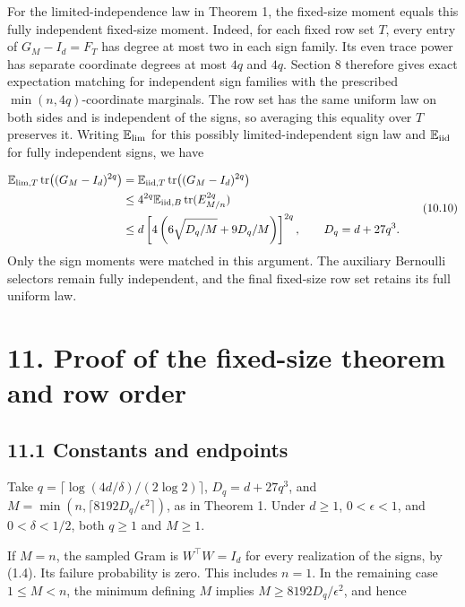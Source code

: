 \documentclass[11pt,a4paper]{article}
\begin{document}
For the limited-independence law in Theorem 1, the fixed-size moment equals this fully independent fixed-size moment. Indeed, for each fixed row set \(T\), every entry of \(G_M-I_d=F_T\) has degree at most two in each sign family. Its even trace power has separate coordinate degrees at most \(4q\) and \(4q\). Section 8 therefore gives exact expectation matching for independent sign families with the prescribed \(\min(n,4q)\)-coordinate marginals. The row set has the same uniform law on both sides and is independent of the signs, so averaging this equality over \(T\) preserves it. Writing \(\mathbb E_{\rm lim}\) for this possibly limited-independent sign law and \(\mathbb E_{\rm iid}\) for fully independent signs, we have

\begin{equation}
\begin{aligned}
\mathbb E_{{\rm lim},T}\operatorname{tr}\bigl((G_M-I_d)^{2q}\bigr)
&=\mathbb E_{{\rm iid},T}\operatorname{tr}\bigl((G_M-I_d)^{2q}\bigr)\\
&\le4^{2q}\mathbb E_{{\rm iid},B}\operatorname{tr}(E_{M/n}^{2q})\\
&\le d\left[4\left(6\sqrt{D_q/M}+9D_q/M\right)\right]^{2q},
\qquad D_q=d+27q^3.
\end{aligned}
\tag{10.10}
\end{equation}
Only the sign moments were matched in this argument. The auxiliary Bernoulli selectors remain fully independent, and the final fixed-size row set retains its full uniform law.

\section*{11. Proof of the fixed-size theorem and row order}
\subsection*{11.1 Constants and endpoints}
Take \(q=\lceil\log(4d/\delta)/(2\log2)\rceil\), \(D_q=d+27q^3\), and \(M=\min(n,\lceil8192D_q/\epsilon^2\rceil)\), as in Theorem 1. Under \(d\ge1\), \(0<\epsilon<1\), and \(0<\delta<1/2\), both \(q\ge1\) and \(M\ge1\).

If \(M=n\), the sampled Gram is \(W^\top W=I_d\) for every realization of the signs, by (1.4). Its failure probability is zero. This includes \(n=1\). In the remaining case \(1\le M<n\), the minimum defining \(M\) implies \(M\ge8192D_q/\epsilon^2\), and hence
\end{document}
